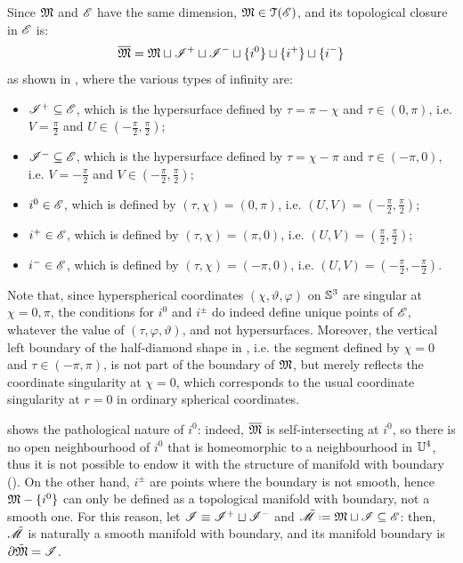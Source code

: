 Since $ \mathfrak{M} $ and $ \mathscr{E} $ have the same dimension, $ \mathfrak{M} \in \EuScript{T}(\mathscr{E}) $, and its topological closure in $ \mathscr{E} $ is:
\begin{equation}
  \overline{\mathfrak{M}} = \mathfrak{M} \sqcup \mathscr{I}^+ \sqcup \mathscr{I}^- \sqcup \{i^0\} \sqcup \{i^+\} \sqcup \{i^-\}
\end{equation}
as shown in , where the various types of infinity are:
\begin{itemize}
  \item {} $ \mathscr{I}^+ \subseteq \mathscr{E} $, which is the hypersurface defined by $ \tau = \pi - \chi $ and $ \tau \in (0,\pi) $, i.e. $ V = \frac{\pi}{2} $ and $ U \in (-\frac{\pi}{2} , \frac{\pi}{2}) $;
  \item {} $ \mathscr{I}^- \subseteq \mathscr{E} $, which is the hypersurface defined by $ \tau = \chi - \pi $ and $ \tau \in (-\pi,0) $, i.e. $ V = -\frac{\pi}{2} $ and $ V \in (-\frac{\pi}{2} , \frac{\pi}{2}) $;
  \item {} $ i^0 \in \mathscr{E} $, which is defined by $ (\tau , \chi) = (0 , \pi) $, i.e. $ (U,V) = (-\frac{\pi}{2} , \frac{\pi}{2}) $;
  \item {} $ i^+ \in \mathscr{E} $, which is defined by $ (\tau , \chi) = (\pi , 0) $, i.e. $ (U,V) = (\frac{\pi}{2} , \frac{\pi}{2}) $;
  \item {} $ i^- \in \mathscr{E} $, which is defined by $ (\tau , \chi) = (-\pi , 0) $, i.e. $ (U,V) = (-\frac{\pi}{2} , -\frac{\pi}{2}) $.
\end{itemize}
Note that, since hyperspherical coordinates $ (\chi , \vartheta , \varphi) $ on $ \mathbb{S}^{3} $ are singular at $ \chi = 0 , \pi $, the conditions for $ i^0 $ and $ i^\pm $ do indeed define unique points of $ \mathscr{E} $, whatever the value of $ (\tau , \varphi , \vartheta) $, and not hypersurfaces. Moreover, the vertical left boundary of the half-diamond shape in , i.e. the segment defined by $ \chi = 0 $ and $ \tau \in (-\pi , \pi) $, is not part of the boundary of $ \mathfrak{M} $, but merely reflects the coordinate singularity at $ \chi = 0 $, which corresponds to the usual coordinate singularity at $ r = 0 $ in ordinary spherical coordinates.

 shows the pathological nature of $ i^0 $: indeed, $ \overline{\mathfrak{M}} $ is self-intersecting at $ i^0 $, so there is no open neighbourhood of $ i^0 $ that is homeomorphic to a neighbourhood in $ \mathbb{U}^4 $, thus it is not possible to endow it with the structure of manifold with boundary (). On the other hand, $ i^\pm $ are points where the boundary is not smooth, hence $ \mathfrak{M} - \{i^0\} $ can only be defined as a topological manifold with boundary, not a smooth one. For this reason, let $ \mathscr{I} \equiv \mathscr{I}^+ \sqcup \mathscr{I}^- $ and $ \tilde{\man} \defeq \mink \sqcup \scri \ssq \esu $: then, $ \tilde{\mathscr{M}} $ is naturally a smooth manifold with boundary, and its manifold boundary is $ \partial \tilde{\mathfrak{M}} = \mathscr{I} $.

